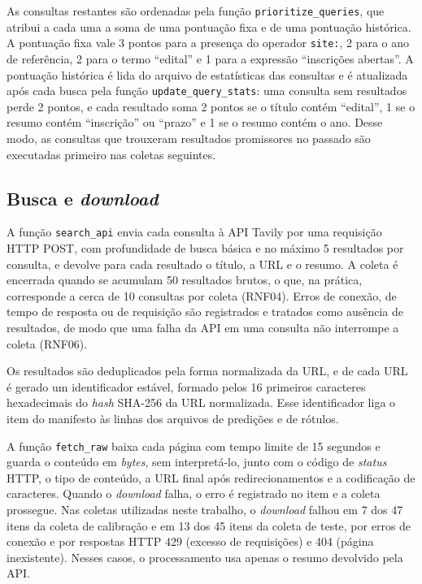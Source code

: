 As consultas restantes são ordenadas pela função \texttt{prioritize\_queries},
que atribui a cada uma a soma de uma pontuação fixa e de uma pontuação
histórica. A pontuação fixa vale 3 pontos para a presença do operador
\texttt{site:}, 2 para o ano de referência, 2 para o termo ``edital'' e 1 para
a expressão ``inscrições abertas''. A pontuação histórica é lida do arquivo de
estatísticas das consultas e é atualizada após cada busca pela função
\texttt{update\_query\_stats}: uma consulta sem resultados perde 2 pontos, e
cada resultado soma 2 pontos se o título contém ``edital'', 1 se o resumo
contém ``inscrição'' ou ``prazo'' e 1 se o resumo contém o ano. Desse modo, as
consultas que trouxeram resultados promissores no passado são executadas
primeiro nas coletas seguintes.

\subsection{Busca e \textit{download}}

A função \texttt{search\_api} envia cada consulta à API Tavily por uma
requisição HTTP POST, com profundidade de busca básica e no máximo 5
resultados por consulta, e devolve para cada resultado o título, a URL e o
resumo. A coleta é encerrada quando se acumulam 50 resultados brutos, o que,
na prática, corresponde a cerca de 10 consultas por coleta (RNF04). Erros de
conexão, de tempo de resposta ou de requisição são registrados e tratados como
ausência de resultados, de modo que uma falha da API em uma consulta não
interrompe a coleta (RNF06).

Os resultados são deduplicados pela forma normalizada da URL, e de cada URL é
gerado um identificador estável, formado pelos 16 primeiros caracteres
hexadecimais do \textit{hash} SHA-256 da URL normalizada. Esse identificador
liga o item do manifesto às linhas dos arquivos de predições e de rótulos.

A função \texttt{fetch\_raw} baixa cada página com tempo limite de 15 segundos
e guarda o conteúdo em \textit{bytes}, sem interpretá-lo, junto com o código de
\textit{status} HTTP, o tipo de conteúdo, a URL final após redirecionamentos e
a codificação de caracteres. Quando o \textit{download} falha, o erro é
registrado no item e a coleta prossegue. Nas coletas utilizadas neste
trabalho, o \textit{download} falhou em 7 dos 47 itens da coleta de calibração
e em 13 dos 45 itens da coleta de teste, por erros de conexão e por respostas
HTTP 429 (excesso de requisições) e 404 (página inexistente). Nesses casos, o
processamento usa apenas o resumo devolvido pela API.

